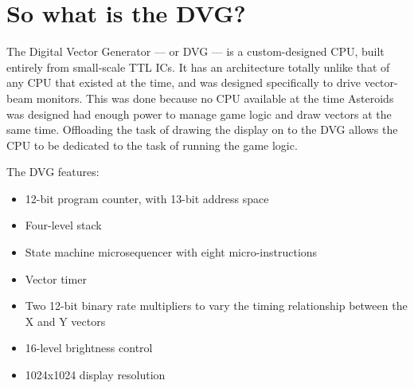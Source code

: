 \section{So what is the DVG?}
The Digital Vector Generator --- or DVG --- is a custom-designed CPU, built
entirely from small-scale TTL ICs. It has an architecture totally unlike that
of any CPU that existed at the time, and was designed specifically to drive
vector-beam monitors. This was done because no CPU available at the time
Asteroids was designed had enough power to manage game logic and draw vectors
at the same time. Offloading the task of drawing the display on to the DVG
allows the CPU to be dedicated to the task of running the game logic.

The DVG features:
\begin{itemize}
	\item{12-bit program counter, with 13-bit address space}
	\item{Four-level stack}
	\item{State machine microsequencer with eight micro-instructions}
	\item{Vector timer}
	\item{Two 12-bit binary rate multipliers to vary the timing relationship between the X and Y vectors}
	\item{16-level brightness control}
	\item{1024x1024 display resolution}
\end{itemize}
